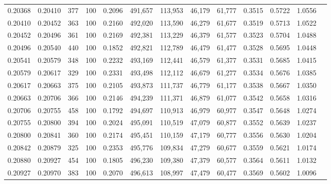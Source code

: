\begin{tabular}{rrrrrrrrrrrrr}
0.20368 & 0.20410 &   377 & 100 &                                     0.2096 & 491,657 & 113,953 &  46,179 &  61,777 & 0.3515 & 0.5722 & 1.0556 \\
0.20410 & 0.20452 &   363 & 100 &                                     0.2160 & 492,020 & 113,590 &  46,279 &  61,677 & 0.3519 & 0.5713 & 1.0522 \\
0.20452 & 0.20496 &   361 & 100 &                                     0.2169 & 492,381 & 113,229 &  46,379 &  61,577 & 0.3523 & 0.5704 & 1.0488 \\
0.20496 & 0.20540 &   440 & 100 &                                     0.1852 & 492,821 & 112,789 &  46,479 &  61,477 & 0.3528 & 0.5695 & 1.0448 \\
0.20541 & 0.20579 &   348 & 100 &                                     0.2232 & 493,169 & 112,441 &  46,579 &  61,377 & 0.3531 & 0.5685 & 1.0415 \\
0.20579 & 0.20617 &   329 & 100 &                                     0.2331 & 493,498 & 112,112 &  46,679 &  61,277 & 0.3534 & 0.5676 & 1.0385 \\
0.20617 & 0.20663 &   375 & 100 &                                     0.2105 & 493,873 & 111,737 &  46,779 &  61,177 & 0.3538 & 0.5667 & 1.0350 \\
0.20663 & 0.20706 &   366 & 100 &                                     0.2146 & 494,239 & 111,371 &  46,879 &  61,077 & 0.3542 & 0.5658 & 1.0316 \\
0.20706 & 0.20755 &   458 & 100 &                                     0.1792 & 494,697 & 110,913 &  46,979 &  60,977 & 0.3547 & 0.5648 & 1.0274 \\
0.20755 & 0.20800 &   394 & 100 &                                     0.2024 & 495,091 & 110,519 &  47,079 &  60,877 & 0.3552 & 0.5639 & 1.0237 \\
0.20800 & 0.20841 &   360 & 100 &                                     0.2174 & 495,451 & 110,159 &  47,179 &  60,777 & 0.3556 & 0.5630 & 1.0204 \\
0.20842 & 0.20879 &   325 & 100 &                                     0.2353 & 495,776 & 109,834 &  47,279 &  60,677 & 0.3559 & 0.5621 & 1.0174 \\
0.20880 & 0.20927 &   454 & 100 &                                     0.1805 & 496,230 & 109,380 &  47,379 &  60,577 & 0.3564 & 0.5611 & 1.0132 \\
0.20927 & 0.20970 &   383 & 100 &                                     0.2070 & 496,613 & 108,997 &  47,479 &  60,477 & 0.3569 & 0.5602 & 1.0096 \\

\end{tabular}
